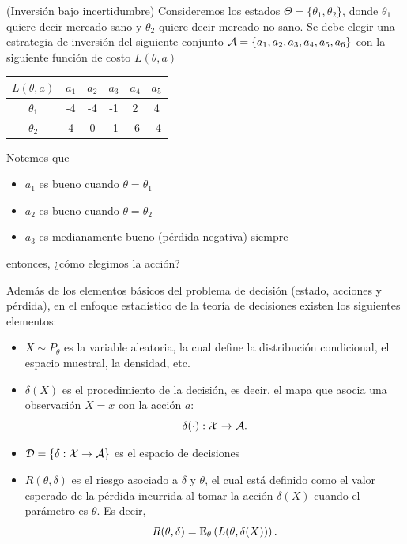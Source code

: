\begin{example}(Inversión bajo incertidumbre)
	Consideremos los estados $\Theta = \{\theta_1,\theta_2\}$, donde $\theta_1$ quiere decir mercado sano y $\theta_2$ quiere decir mercado no sano. Se debe elegir una estrategia de inversión del siguiente conjunto ${\mathcal A}=\{a_1,a_2,a_3,a_4,a_5,a_6\}$ con la siguiente función de costo $L(\theta,a)$
	\begin{table}[ht]
		\centering
		\begin{tabular}{c|c|c|c|c|c}
			$L(\theta,a)$   & $a_1$ & $a_2$ & $a_3$ & $a_4$ & $a_5$ \\
			\hline
			$\theta_1$ & -4   & -4   & -1   & 2    & 4    \\
			$\theta_2$  & 4    & 0    & -1   & -6   & -4
		\end{tabular}
	\end{table} 
	Notemos que \begin{itemize}
		\item $a_1$ es bueno  cuando $\theta=\theta_1$
		\item $a_2$ es bueno cuando $\theta=\theta_2$
		\item $a_3$ es medianamente bueno (pérdida negativa) siempre
	\end{itemize}
	entonces, ¿cómo elegimos la acción?
\end{example}

Además de los elementos básicos del problema de decisión (estado, acciones y pérdida), en el enfoque estadístico de la teoría de decisiones existen los siguientes elementos:
\begin{itemize}
	\item $X\sim P_\theta$ es la variable aleatoria, la cual define la distribución condicional, el espacio muestral, la densidad, etc. 
	\item $\delta(X)$ es el procedimiento de la decisión, es decir, el mapa que asocia una observación $X=x$ con la acción $a$:
	\begin{equation}
		\delta(\cdot):{\mathcal X}\rightarrow{\mathcal A}.
	\end{equation}
	\item ${\mathcal D}=\{\delta:{\mathcal X}\rightarrow{\mathcal A}\}$ es el espacio de decisiones
	\item $R(\theta,\delta)$ es el riesgo asociado a $\delta$ y $\theta$, el cual está definido como el valor esperado de la pérdida incurrida al tomar la acción $\delta(X)$ cuando el parámetro es $\theta$. Es decir, 
	\begin{equation}
	 	R(\theta,\delta) = \mathbb{E}_\theta \left(L(\theta,\delta(X))\right).
	 \end{equation} 
\end{itemize}


